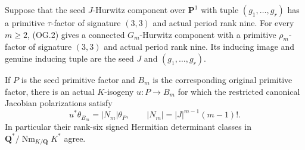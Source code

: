 \begin{proposition}[D-OG-02]
Suppose that the seed $J$-Hurwitz component over $\mathbf P^1$
with tuple $(g_1,\ldots,g_r)$ has a primitive $\tau$-factor of
signature $(3,3)$ and actual period rank nine.  For every $m\ge2$,
(OG.2) gives a connected $G_m$-Hurwitz component with a primitive
$\rho_m$-factor of signature $(3,3)$ and actual period rank nine.
Its inducing image and genuine inducing tuple are the seed $J$
and $(g_1,\ldots,g_r)$.

If $P$ is the seed primitive factor and $B_m$ is the corresponding
original primitive factor, there is an actual $K$-isogeny
$u:P\longrightarrow B_m$ for which the restricted canonical
Jacobian polarizations satisfy
\[
 u^*\theta_{B_m}=|N_m|\theta_P,\qquad
 |N_m|=|J|^{m-1}(m-1)!.
 \tag{OG.5}
\]
In particular their rank-six signed Hermitian determinant classes
in $\mathbf Q^*/\operatorname{Nm}_{K/\mathbf Q}K^*$ agree.
\end{proposition}

